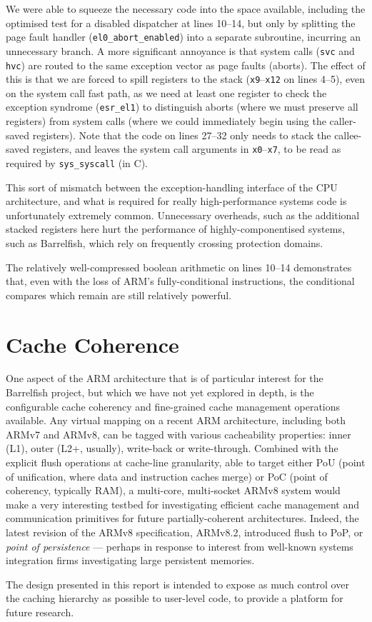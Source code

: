 \documentclass[a4paper,twoside]{report}
\begin{document}
We were able to squeeze the necessary code into the space available, including
the optimised test for a disabled dispatcher at lines 10--14, but only by
splitting the page fault handler (\texttt{el0\_abort\_enabled}) into a
separate subroutine, incurring an unnecessary branch. A more significant
annoyance is that system calls (\texttt{svc} and \texttt{hvc}) are routed to
the same exception vector as page faults (aborts).  The effect of this is that
we are forced to spill registers to the stack (\texttt{x9}--\texttt{x12} on
lines 4--5), even on the system call fast path, as we need at least one
register to check the exception syndrome (\texttt{esr\_el1}) to distinguish
aborts (where we must preserve all registers) from system calls (where we
could immediately begin using the caller-saved registers). Note that the code
on lines 27--32 only needs to stack the callee-saved registers, and leaves the
system call arguments in \texttt{x0}--\texttt{x7}, to be read as required by
\texttt{sys\_syscall} (in C).

This sort of mismatch between the exception-handling interface of the CPU
architecture, and what is required for really high-performance systems code is
unfortunately extremely common. Unnecessary overheads, such as the additional
stacked registers here hurt the performance of highly-componentised systems,
such as Barrelfish, which rely on frequently crossing protection domains.

The relatively well-compressed boolean arithmetic on lines 10--14 demonstrates
that, even with the loss of ARM's fully-conditional instructions, the
conditional compares which remain are still relatively powerful.

\section{Cache Coherence}

One aspect of the ARM architecture that is of particular interest for the
Barrelfish project, but which we have not yet explored in depth, is the
configurable cache coherency and fine-grained cache management operations
available. Any virtual mapping on a recent ARM architecture, including both
ARMv7 and ARMv8, can be tagged with various cacheability properties: inner
(L1), outer (L2+, usually), write-back or write-through. Combined with the
explicit flush operations at cache-line granularity, able to target either PoU
(point of unification, where data and instruction caches merge) or PoC (point
of coherency, typically RAM), a multi-core, multi-socket ARMv8 system would
make a very interesting testbed for investigating efficient cache management
and communication primitives for future partially-coherent architectures.
Indeed, the latest revision of the ARMv8 specification, ARMv8.2, introduced
flush to PoP, or \emph{point of persistence} --- perhaps in response to
interest from well-known systems integration firms investigating large
persistent memories.

The design presented in this report is intended to expose as much control over
the caching hierarchy as possible to user-level code, to provide a platform
for future research.



\end{document}
